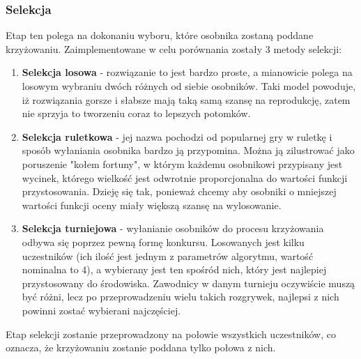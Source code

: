 \subsubsection{Selekcja}
Etap ten polega na dokonaniu wyboru, które osobnika zostaną poddane krzyżowaniu. Zaimplementowane w celu porównania zostały 3 metody selekcji:
\begin{enumerate}
\item \textbf{Selekcja losowa} - rozwiązanie to jest bardzo proste, a mianowicie polega na losowym wybraniu dwóch różnych od siebie osobników. Taki model powoduje, iż rozwiązania gorsze i słabsze mają taką samą szansę na reprodukcję, zatem nie sprzyja to tworzeniu coraz to lepszych potomków.
\item \textbf{Selekcja ruletkowa} - jej nazwa pochodzi od popularnej gry w ruletkę i sposób wyłaniania osobnika bardzo ją przypomina. Można ją zilustrować jako poruszenie "kołem fortuny", w którym każdemu osobnikowi przypisany jest wycinek, którego wielkość jest odwrotnie proporcjonalna do wartości funkcji przystosowania. Dzieję się tak, ponieważ chcemy aby osobniki o mniejszej wartości funkcji oceny miały większą szansę na wylosowanie.
\item \textbf{Selekcja turniejowa} - wyłanianie osobników do procesu krzyżowania odbywa się poprzez pewną formę konkursu. Losowanych jest kilku uczestników (ich ilość jest jednym z parametrów algorytmu, wartość nominalna to 4), a wybierany jest ten spośród nich, który jest najlepiej przystosowany do środowiska. Zawodnicy w danym turnieju oczywiście muszą być różni, lecz po przeprowadzeniu wielu takich rozgrywek, najlepsi z nich powinni zostać wybierani najczęściej.
\end{enumerate}
\par Etap selekcji zostanie przeprowadzony na połowie wszystkich uczestników, co oznacza, że krzyżowaniu zostanie poddana tylko połowa z nich.
